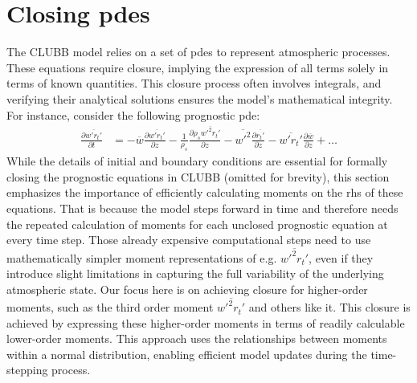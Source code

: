 \section{Closing pdes}\label{sec:closing_pdes}

The \gls{CLUBB} model relies on a set of \glspl{pde} to represent atmospheric processes.
These equations require closure,
implying the expression of all terms solely in terms of known quantities.
This closure process often involves integrals,
and verifying their analytical solutions ensures the model's mathematical integrity.
For instance, consider the following prognostic {\gls{pde}\autocite[p. 21]{larson2022clubbsilhs}}:
\begin{align*}
    \frac{\partial \overline{w'r_t'}}{\partial t}
    &= -\overline{w}\frac{\partial \overline{w'r_t'}}{\partial z}
    - \frac{1}{\rho_s} \frac{\partial \rho_s \overline{w'^2 r_t'}}{\partial z}
    - \overline{w'^2} \frac{\partial \overline{r_t'}}{\partial z}
    - \overline{w'r_t'} \frac{\partial \overline{w}}{\partial z}
    + \ldots
\end{align*}
While the details of initial and boundary conditions are essential
for formally closing the prognostic equations in \gls{CLUBB} (omitted for brevity),
this section emphasizes the importance of efficiently calculating moments
on the \gls{rhs} of these equations.
That is because the model steps forward in time
and therefore needs the repeated calculation of moments
for each unclosed prognostic equation at every time step.
Those already expensive computational steps need to use mathematically simpler moment representations
of e.g. $\overline{w'^2 r_t'}$,
even if they introduce slight limitations
in capturing the full variability of the underlying atmospheric state.
Our focus here is on achieving closure for higher-order moments,
such as the third order moment $\overline{w'^2 r_t'}$ and others like it.
This closure is achieved by expressing these higher-order moments
in terms of readily calculable lower-order moments.
This approach uses the relationships between moments within a normal distribution,
enabling efficient model updates during the time-stepping process.